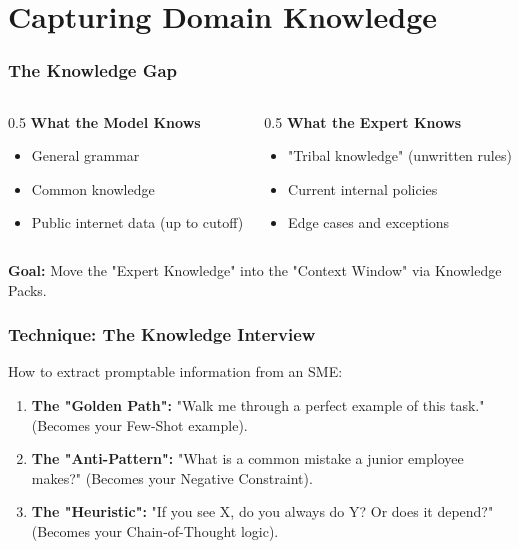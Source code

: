 \documentclass{beamer}
\begin{document}
\section{Capturing Domain Knowledge}

\begin{frame}
    \frametitle{The Knowledge Gap}
    \begin{columns}
        \begin{column}{0.5\textwidth}
            \textbf{What the Model Knows}
            \begin{itemize}
                \item General grammar
                \item Common knowledge
                \item Public internet data (up to cutoff)
            \end{itemize}
        \end{column}
        \begin{column}{0.5\textwidth}
            \textbf{What the Expert Knows}
            \begin{itemize}
                \item "Tribal knowledge" (unwritten rules)
                \item Current internal policies
                \item Edge cases and exceptions
            \end{itemize}
        \end{column}
    \end{columns}
    \vspace{0.5cm}
    \textbf{Goal:} Move the "Expert Knowledge" into the "Context Window" via Knowledge Packs.
\end{frame}

\begin{frame}
    \frametitle{Technique: The Knowledge Interview}
    How to extract promptable information from an SME:
    \begin{enumerate}
        \item \textbf{The "Golden Path":} "Walk me through a perfect example of this task." (Becomes your Few-Shot example).
        \item \textbf{The "Anti-Pattern":} "What is a common mistake a junior employee makes?" (Becomes your Negative Constraint).
        \item \textbf{The "Heuristic":} "If you see X, do you always do Y? Or does it depend?" (Becomes your Chain-of-Thought logic).
    \end{enumerate}
\end{frame}
\end{document}
